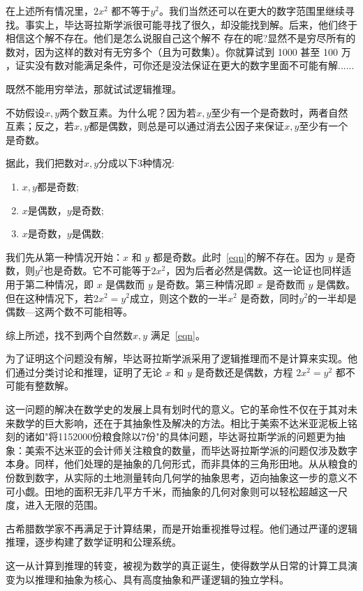 在上述所有情况里，$2x^2$ 都不等于$y^2$。我们当然还可以在更大的数字范围里继续寻找。事实上，毕达哥拉斯学派很可能寻找了很久，却没能找到解。后来，他们终于相信这个解不存在。他们是怎么说服自己这个解不 存在的呢?显然不是穷尽所有的数对，因为这样的数对有{无穷多个（且为可数集）}。你就算试到 1000 甚至 100 万 ，证实没有数对能满足条件，可你还是没法保证在更大的数字里面不可能有解......

既然不能用穷举法，那就试试逻辑推理。

不妨假设$x,y$两个数互素。为什么呢？因为若$x,y$至少有一个是奇数时，两者自然互素；反之，若$x,y$都是偶数，则总是可以通过消去公因子来保证$x,y$至少有一个是奇数。

据此，我们把数对$x,y$分成以下3种情况:
\begin{enumerate}
\item $x,y$都是奇数;
\item $x$是偶数，$y$是奇数;
\item $x$是奇数，$y$是偶数;
\end{enumerate}
我们先从第一种情况开始：$x$ 和 $y$ 都是奇数。此时~\eqref{eqn}的解不存在。因为 $y$ 是奇数，则$y^2$也是奇数。它不可能等于$2x^2$，因为后者必然是偶数。这一论证也同样适用于第二种情况，即 $x$ 是偶数而 $y$ 是奇数。第三种情况即 $x$ 是奇数而 $y$ 是偶数。但在这种情况下，若$2x^2=y^2$成立，则这个数的一半$x^2$ 是奇数，同时$y^2$的一半却是偶数---这两个数不可能相等。

综上所述，找不到两个自然数$x,y$ 满足~\eqref{eqn}。

为了证明这个问题没有解，毕达哥拉斯学派采用了逻辑推理而不是计算来实现。他们通过分类讨论和推理，证明了无论 $x$ 和 $y$ 是奇数还是偶数，方程 $2x^2 = y^2$ 都不可能有整数解。

这一问题的解决在数学史的发展上具有划时代的意义。它的革命性不仅在于其对未来数学的巨大影响，还在于其抽象性及解决的方法。相比于美索不达米亚泥板上铭刻的诸如"将1152000份粮食除以7份"的具体问题，毕达哥拉斯学派的问题更为抽象：美索不达米亚的会计师关注粮食的数量，而毕达哥拉斯学派的问题仅涉及数字本身。同样，他们处理的是抽象的几何形式，而非具体的三角形田地。从从粮食的份数到数字，从实际的土地测量转向几何学的抽象思考，迈向抽象这一步的意义不可小觑。田地的面积无非几平方千米，而抽象的几何对象则可以轻松超越这一尺度，进入无限的范围。

古希腊数学家不再满足于计算结果，而是开始重视推导过程。他们通过严谨的逻辑推理，逐步构建了数学证明和公理系统。

这一从计算到推理的转变，被视为数学的真正诞生，使得数学从日常的计算工具演变为以推理和抽象为核心、具有高度抽象和严谨逻辑的独立学科。

